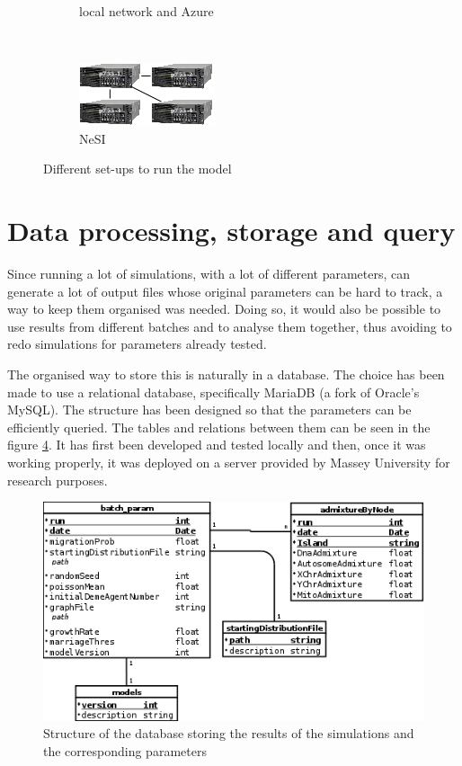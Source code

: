 \documentclass[a4paper,12pt]{report}
\begin{document}
\begin{figure}
\begin{subfigure}[t]{0.48\textwidth}
		\caption{local network and Azure}
		\label{network:azure}
	\end{subfigure}
	~
	\begin{subfigure}[t]{0.48\textwidth}
		\centering
		\includegraphics[scale=1]{../data/network:nesi.png}
		\caption{NeSI}
		\label{network:nesi}
	\end{subfigure}
	\caption{Different set-ups to run the model}
	\label{network}
\end{figure}

\section{Data processing, storage and query}
Since running a lot of simulations, with a lot of different parameters, can generate a lot of output files whose original parameters can be hard to track, a way to keep them organised was needed. Doing so, it would also be possible to use results from different batches and to analyse them together, thus avoiding to redo simulations for parameters already tested.

The organised way to store this is naturally in a database. The choice has been made to use a relational database, specifically MariaDB (a fork of Oracle's MySQL). The structure has been designed so that the parameters can be efficiently queried. The tables and relations between them can be seen in the figure \ref{db}. It has first been developed and tested locally and then, once it was working properly, it was deployed on a server provided by Massey University for research purposes.

\begin{figure}
	\hspace*{-1cm}
	\includegraphics[scale=0.87]{../data/DB.png}
	\caption{Structure of the database storing the results of the simulations and the corresponding parameters}
	\label{db}
\end{figure}
\end{document}
